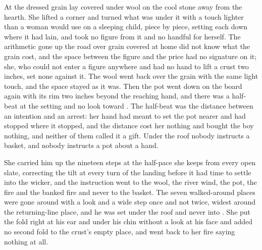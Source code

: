 At  the dressed grain lay covered under wool on the cool stone away from the hearth. She lifted a corner and turned what was under it with a touch lighter than a woman would use on a sleeping child, piece by piece, setting each down where it had lain, and took no figure from it and no handful for herself. The arithmetic gone up the road over grain covered at home did not know what the grain cost, and the space between the figure and the price had no signature on it; she, who could not enter a figure anywhere and had no hand to lift a crust two inches, set none against it. The wool went back over the grain with the same light touch, and the space stayed as it was. Then the pot went down on the board again with its rim two inches beyond the reaching hand, and there was a half-beat at the setting and no look toward . The half-beat was the distance between an intention and an arrest: her hand had meant to set the pot nearer and had stopped where it stopped, and the distance cost her nothing and bought the boy nothing, and neither of them called it a gift. Under the roof nobody instructs a basket, and nobody instructs a pot about a hand.

She carried him up the nineteen steps at the half-pace she keeps from every open slate, correcting the tilt at every turn of the landing before it had time to settle into the wicker, and the instruction went to the wool, the river wind, the pot, the fire and the banked fire and never to the basket. The seven walked-around places were gone around with a look and a wide step once and not twice, widest around the returning-line place, and he was set under the roof and never into . She put the fold right at his ear and under his chin without a look at his face and added no second fold to the crust's empty place, and went back to her fire saying nothing at all.

